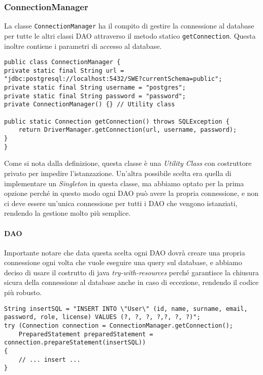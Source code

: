 \subsubsection{ConnectionManager}
La classe \texttt{ConnectionManager} ha il compito di gestire la connessione al database per tutte le altri classi DAO attraverso il metodo statico \texttt{getConnection}. Questa inoltre contiene i parametri di accesso al database.
\begin{lstlisting}[style=java, caption={Implementazione del ConnectionManager}]
public class ConnectionManager {
private static final String url = "jdbc:postgresql://localhost:5432/SWE?currentSchema=public";
private static final String username = "postgres";
private static final String password = "password";
private ConnectionManager() {} // Utility class

public static Connection getConnection() throws SQLException {
    return DriverManager.getConnection(url, username, password);
}
}
\end{lstlisting}
Come si nota dalla definizione, questa classe è una \textit{Utility Class} con costruttore privato per impedire l'istanzazione. Un'altra possibile scelta era quella di implementare un \textit{Singleton} in questa classe, ma abbiamo optato per la prima opzione perché in questo modo ogni DAO può avere la propria connessione, e non ci deve essere un'unica connessione per tutti i DAO che vengono istanziati, rendendo la gestione molto più semplice.
\paragraph{DAO} Importante notare che data questa scelta ogni DAO dovrà creare una propria connessione ogni volta che vuole eseguire una query sul database, e abbiamo deciso di usare il costrutto di java \textit{try-with-resources} perché garantisce la chiusura sicura della connessione al database anche in caso di eccezione, rendendo il codice più robusto.
\begin{lstlisting}[style=java, caption={Esempio di uso di try-with-resources per la connessione nel metodo insertUser di UserDAO}]
String insertSQL = "INSERT INTO \"User\" (id, name, surname, email, password, role, license) VALUES (?, ?, ?, ?,?, ?, ?)";
try (Connection connection = ConnectionManager.getConnection();
    PreparedStatement preparedStatement = connection.prepareStatement(insertSQL))
{
    // ... insert ...
}
\end{lstlisting}

